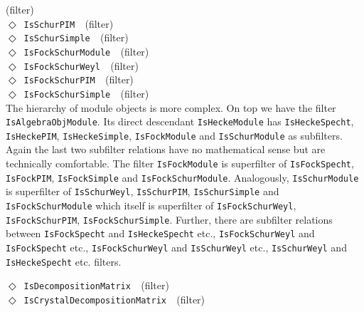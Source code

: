\documentclass[a4paper,11pt]{report}
\begin{document}
{{{{{\label{IsSchurWeyl}
}\hfill{\scriptsize (filter)}}\\
\noindent\textcolor{FuncColor}{$\Diamond$\ \texttt{IsSchurPIM
\label{IsSchurPIM}
}\hfill{\scriptsize (filter)}}\\
\noindent\textcolor{FuncColor}{$\Diamond$\ \texttt{IsSchurSimple
\label{IsSchurSimple}
}\hfill{\scriptsize (filter)}}\\
\noindent\textcolor{FuncColor}{$\Diamond$\ \texttt{IsFockSchurModule
\label{IsFockSchurModule}
}\hfill{\scriptsize (filter)}}\\
\noindent\textcolor{FuncColor}{$\Diamond$\ \texttt{IsFockSchurWeyl
\label{IsFockSchurWeyl}
}\hfill{\scriptsize (filter)}}\\
\noindent\textcolor{FuncColor}{$\Diamond$\ \texttt{IsFockSchurPIM
\label{IsFockSchurPIM}
}\hfill{\scriptsize (filter)}}\\
\noindent\textcolor{FuncColor}{$\Diamond$\ \texttt{IsFockSchurSimple
\label{IsFockSchurSimple}
}\hfill{\scriptsize (filter)}}\\


 The hierarchy of module objects is more complex. On top we have the filter \texttt{IsAlgebraObjModule}. Its direct descendant \texttt{IsHeckeModule} has \texttt{IsHeckeSpecht}, \texttt{IsHeckePIM}, \texttt{IsHeckeSimple}, \texttt{IsFockModule} and \texttt{IsSchurModule} as subfilters. Again the last two subfilter relations have no mathematical
sense but are technically comfortable. The filter \texttt{IsFockModule} is superfilter of \texttt{IsFockSpecht}, \texttt{IsFockPIM}, \texttt{IsFockSimple} and \texttt{IsFockSchurModule}. Analogously, \texttt{IsSchurModule} is superfilter of \texttt{IsSchurWeyl}, \texttt{IsSchurPIM}, \texttt{IsSchurSimple} and \texttt{IsFockSchurModule} which itself is superfilter of \texttt{IsFockSchurWeyl}, \texttt{IsFockSchurPIM}, \texttt{IsFockSchurSimple}. Further, there are subfilter relations between \texttt{IsFockSpecht} and \texttt{IsHeckeSpecht} etc., \texttt{IsFockSchurWeyl} and \texttt{IsFockSpecht} etc., \texttt{IsFockSchurWeyl} and \texttt{IsSchurWeyl} etc., \texttt{IsSchurWeyl} and \texttt{IsHeckeSpecht} etc. filters.

 \noindent\textcolor{FuncColor}{$\Diamond$\ \texttt{IsDecompositionMatrix
\label{IsDecompositionMatrix}
}\hfill{\scriptsize (filter)}}\\
\noindent\textcolor{FuncColor}{$\Diamond$\ \texttt{IsCrystalDecompositionMatrix
\label{IsCrystalDecompositionMatrix}
}\hfill{\scriptsize (filter)}}\\


}}}
\end{document}
